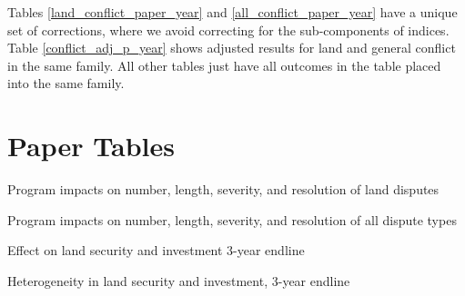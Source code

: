 \documentclass[10pt]{article}
\begin{document}
Tables \ref{land_conflict_paper_year} and \ref{all_conflict_paper_year} have a unique set of corrections, where we avoid correcting for the sub-components of indices. Table \ref{conflict_adj_p_year} shows adjusted results for land and general conflict in the same family. All other tables just have all outcomes in the table placed into the same family. 





\section{Paper Tables}
\begin{table}[H]
\caption{ Program impacts on number, length, severity, and resolution of land disputes}
\label{land_conflict_paper_year}
\begin{center}
\begin{adjustbox}{max width = \textwidth}

\end{adjustbox}
\end{center}
\end{table}

\begin{table}[H]
\caption{Program impacts on number, length, severity, and resolution of all dispute types}
\begin{center}
\begin{adjustbox}{max width = \textwidth}
\label{all_conflict_paper_year}

\end{adjustbox}
\end{center}
\end{table}

\begin{table}[H]
\caption{Effect on land security and investment 3-year endline}
\begin{center}
\begin{adjustbox}{max width = \textwidth}

\end{adjustbox}
\end{center}
\end{table}

\begin{table}[H]
\caption{Heterogeneity in land security and investment, 3-year endline}
\begin{center}
\begin{adjustbox}{max width = \textwidth}

\end{adjustbox}
\end{center}
\end{table}
\end{document}
